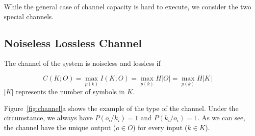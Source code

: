 While the general case of channel capacity is hard to execute, we consider the two special channels.

\subsection{Noiseless Lossless Channel}
The channel of the system is noiseless and lossless if

\begin{equation} \label{eq:1}
    C(K;O) = \max_{p(k)} I(K;O) = \max_{p(k)} H|O| =\max_{p(k)} H|K|
\end{equation}
$|K|$ represents the number of symbols in $K$. 

Figure~\ref{fig:channel}a shows the example of the type of the channel. Under the circumstance, we always have $P(o_i/k_i) = 1$ and $P(k_i/o_i) = 1$. As we can see, the channel have the unique output ($o \in O$) for every input ($k \in K$). 

